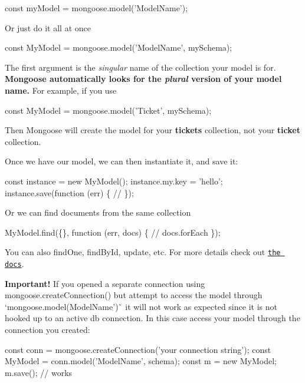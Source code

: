 \begin{DoxyCode}
const myModel = mongoose.model('ModelName');
\end{DoxyCode}


Or just do it all at once


\begin{DoxyCode}
const MyModel = mongoose.model('ModelName', mySchema);
\end{DoxyCode}


The first argument is the {\itshape singular} name of the collection your model is for. {\bfseries Mongoose automatically looks for the {\itshape plural} version of your model name.} For example, if you use


\begin{DoxyCode}
const MyModel = mongoose.model('Ticket', mySchema);
\end{DoxyCode}


Then Mongoose will create the model for your {\bfseries tickets} collection, not your {\bfseries ticket} collection.

Once we have our model, we can then instantiate it, and save it\+:


\begin{DoxyCode}
const instance = new MyModel();
instance.my.key = 'hello';
instance.save(function (err) \{
  //
\});
\end{DoxyCode}


Or we can find documents from the same collection


\begin{DoxyCode}
MyModel.find(\{\}, function (err, docs) \{
  // docs.forEach
\});
\end{DoxyCode}


You can also {\ttfamily find\+One}, {\ttfamily find\+By\+Id}, {\ttfamily update}, etc. For more details check out \href{http://mongoosejs.com/docs/queries.html}{\tt the docs}.

{\bfseries Important!} If you opened a separate connection using {\ttfamily mongoose.\+create\+Connection()} but attempt to access the model through `mongoose.\+model(\textquotesingle{}Model\+Name')\`{} it will not work as expected since it is not hooked up to an active db connection. In this case access your model through the connection you created\+:


\begin{DoxyCode}
const conn = mongoose.createConnection('your connection string');
const MyModel = conn.model('ModelName', schema);
const m = new MyModel;
m.save(); // works
\end{DoxyCode}


